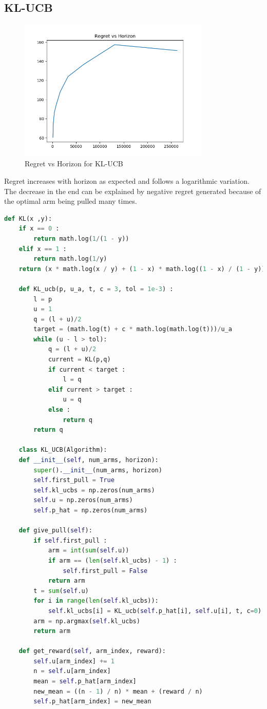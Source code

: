 \documentclass[11pt]{article}
\begin{document}
   \subsection*{KL-UCB}
 \begin{figure}[H]
    \begin{center}
        \includegraphics[width=0.81\textwidth]{../images/task1-KL_UCB-20230907-232229.png}
        
        \caption{Regret vs Horizon for KL-UCB}
    \end{center}
 \end{figure} 
 Regret increases with horizon as expected and follows a logarithmic variation. The decrease
 in the end can be explained by negative regret generated because of the optimal arm being pulled many times.
 \begin{lstlisting}[language=Python]      
    def KL(x ,y):
    if x == 0 :
        return math.log(1/(1 - y))
    elif x == 1 :
        return math.log(1/y)
    return (x * math.log(x / y) + (1 - x) * math.log((1 - x) / (1 - y)))

    def KL_ucb(p, u_a, t, c = 3, tol = 1e-3) : 
        l = p
        u = 1
        q = (l + u)/2   
        target = (math.log(t) + c * math.log(math.log(t)))/u_a
        while (u - l > tol):
            q = (l + u)/2
            current = KL(p,q)
            if current < target :
                l = q
            elif current > target :
                u = q
            else :
                return q
        return q  

    class KL_UCB(Algorithm):
    def __init__(self, num_arms, horizon):
        super().__init__(num_arms, horizon)
        self.first_pull = True
        self.kl_ucbs = np.zeros(num_arms)
        self.u = np.zeros(num_arms)
        self.p_hat = np.zeros(num_arms)
    
    def give_pull(self):
        if self.first_pull :
            arm = int(sum(self.u))
            if arm == (len(self.kl_ucbs) - 1) :
                self.first_pull = False
            return arm
        t = sum(self.u)
        for i in range(len(self.kl_ucbs)):
            self.kl_ucbs[i] = KL_ucb(self.p_hat[i], self.u[i], t, c=0)
        arm = np.argmax(self.kl_ucbs)
        return arm
    
    def get_reward(self, arm_index, reward):
        self.u[arm_index] += 1
        n = self.u[arm_index]
        mean = self.p_hat[arm_index]
        new_mean = ((n - 1) / n) * mean + (reward / n)
        self.p_hat[arm_index] = new_mean\end{lstlisting}
\end{document}
